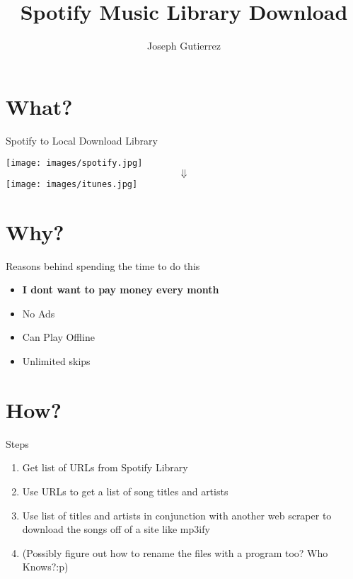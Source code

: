 \documentclass{beamer}
\title{Spotify Music Library Download}
\author{Joseph Gutierrez}
\institute{University of Texas at El Paso}
\begin{document}
	\maketitle
	
	\tableofcontents
	
	\section{What?}
		\begin{frame}{Spotify to Local Download Library}
			\begin{center}
				\texttt{[image: images/spotify.jpg]}
				\pause
					$$\Downarrow$$
				\pause
				\texttt{[image: images/itunes.jpg]}
			\end{center}
		\end{frame}
			
	\section{Why?}
		\begin{frame}{Reasons behind spending the time to do this}
			\begin{itemize}
				\item \textbf{I dont want to pay money every month}
				\item No Ads
				\item Can Play Offline
				\item Unlimited skips
			\end{itemize}
		\end{frame}
	
	\section{How?}
		\begin{frame}{Steps}
			\begin{enumerate}
				\item Get list of URLs from Spotify Library
				\item Use URLs to get a list of song titles and artists
				\item Use list of titles and artists in conjunction with another web scraper to download the songs off of a site like mp3ify
				\item (Possibly figure out how to rename the files with a program too? Who Knows?:p)
			\end{enumerate}
		\end{frame}
	
\end{document}

